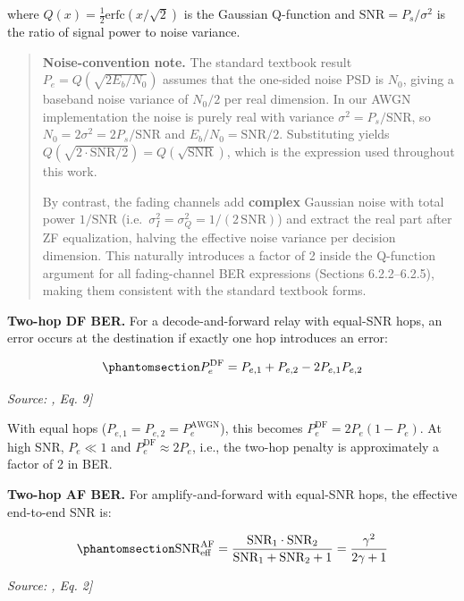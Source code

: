 where \(Q(x) = \frac{1}{2}\text{erfc}(x/\sqrt{2})\) is the Gaussian Q-function and \(\text{SNR} = P_s / \sigma^2\) is the ratio of signal power to noise variance.

\begin{quote}
\textbf{Noise-convention note.} The standard textbook result \(P_e = Q(\sqrt{2 E_b/N_0})\) assumes that the one-sided noise PSD is \(N_0\), giving a baseband noise variance of \(N_0/2\) per real dimension. In our AWGN implementation the noise is purely real with variance \(\sigma^2 = P_s/\text{SNR}\), so \(N_0 = 2\sigma^2 = 2P_s/\text{SNR}\) and \(E_b/N_0 = \text{SNR}/2\). Substituting yields \(Q(\sqrt{2 \cdot \text{SNR}/2}) = Q(\sqrt{\text{SNR}})\), which is the expression used throughout this work.

By contrast, the fading channels add \textbf{complex} Gaussian noise with total power \(1/\text{SNR}\) (i.e.~\(\sigma_I^2 = \sigma_Q^2 = 1/(2\,\text{SNR})\)) and extract the real part after ZF equalization, halving the effective noise variance per decision dimension. This naturally introduces a factor of 2 inside the Q-function argument for all fading-channel BER expressions (Sections 6.2.2--6.2.5), making them consistent with the standard textbook forms.
\end{quote}

\textbf{Two-hop DF BER.} For a decode-and-forward relay with equal-SNR hops, an error occurs at the destination if exactly one hop introduces an error:

\begin{equation}\protect\phantomsection\label{eq:df-ber-awgn}{P_e^{\text{DF}} = P_{e,1} + P_{e,2} - 2P_{e,1}P_{e,2}
}\end{equation} \par{\small\textit{Source: \cite{Laneman2004CooperativeDiversity}, Eq. 9]}}

With equal hops (\(P_{e,1} = P_{e,2} = P_e^{\text{AWGN}}\)), this becomes \(P_e^{\text{DF}} = 2P_e(1 - P_e)\). At high SNR, \(P_e \ll 1\) and \(P_e^{\text{DF}} \approx 2P_e\), i.e., the two-hop penalty is approximately a factor of 2 in BER.

\textbf{Two-hop AF BER.} For amplify-and-forward with equal-SNR hops, the effective end-to-end SNR is:

\begin{equation}\protect\phantomsection\label{eq:af-snr-eff}{\text{SNR}_{\text{eff}}^{\text{AF}} = \frac{\text{SNR}_1 \cdot \text{SNR}_2}{\text{SNR}_1 + \text{SNR}_2 + 1} = \frac{\gamma^2}{2\gamma + 1}
}\end{equation} \par{\small\textit{Source: \cite{Laneman2004CooperativeDiversity}, Eq. 2]}}

